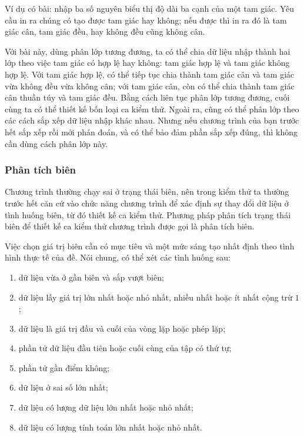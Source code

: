 \documentclass[11pt]{article}
\begin{document}
Ví dụ có bài: nhập ba số nguyên biểu thị độ dài ba cạnh của một tam giác. Yêu
cầu in ra chúng có tạo được tam giác hay không; nếu được thì in ra đó là tam
giác cân, tam giác đều, hay không đều cũng không cân.

Với bài này, dùng phân lớp tương đương, ta có thể chia dữ liệu nhập thành hai
lớp theo việc tam giác có hợp lệ hay không: tam giác hợp lệ và tam giác không
hợp lệ. Với tam giác hợp lệ, có thể tiếp tục chia thành tam giác cân và tam
giác vừa không đều vừa không cân; với tam giác cân, còn có thể chia thành tam
giác cân thuần túy và tam giác đều. Bằng cách liên tục phân lớp tương đương,
cuối cùng ta có thể thiết kế bốn loại ca kiểm thử. Ngoài ra, cũng có thể phân
lớp theo các cách sắp xếp dữ liệu nhập khác nhau. Nhưng nếu chương trình của
bạn trước hết sắp xếp rồi mới phán đoán, và có thể bảo đảm phần sắp xếp đúng,
thì không cần dùng cách phân lớp này.

\subsubsection{Phân tích biên}

Chương trình thường chạy sai ở trạng thái biên, nên trong kiểm thử ta thường
trước hết căn cứ vào chức năng chương trình để xác định sự thay đổi dữ liệu ở
tình huống biên, từ đó thiết kế ca kiểm thử. Phương pháp phân tích trạng thái
biên để thiết kế ca kiểm thử chương trình được gọi là phân tích biên.

Việc chọn giá trị biên cần có mục tiêu và một mức sáng tạo nhất định theo
tình hình thực tế của đề. Nói chung, có thể xét các tình huống sau:
\begin{enumerate}
  \item dữ liệu vừa ở gần biên và sắp vượt biên;
  \item dữ liệu lấy giá trị lớn nhất hoặc nhỏ nhất, nhiều nhất hoặc ít nhất
  cộng trừ \(1\);
  \item dữ liệu là giá trị đầu và cuối của vòng lặp hoặc phép lặp;
  \item phần tử dữ liệu đầu tiên hoặc cuối cùng của tập có thứ tự;
  \item phần tử gần điểm không;
  \item dữ liệu ở sai số lớn nhất;
  \item dữ liệu có lượng dữ liệu lớn nhất hoặc nhỏ nhất;
  \item dữ liệu có lượng tính toán lớn nhất hoặc nhỏ nhất.
\end{enumerate}
\end{document}
